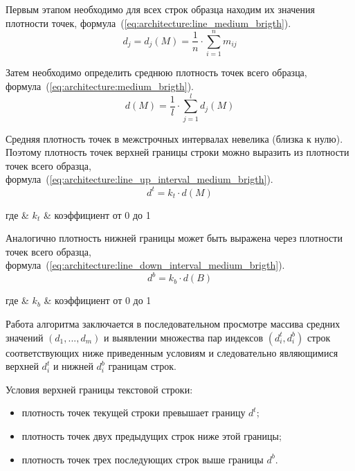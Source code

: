 Первым этапом необходимо для всех строк образца находим их значения плотности точек, формула~(\ref{eq:architecture:line_medium_brigth}).
\begin{equation}
  \label{eq:architecture:line_medium_brigth}
  d_j = d_j(M) = \frac{1}{n}\cdot\sum\limits_{i=1}^{n} m_{ij}
\end{equation}

Затем необходимо определить среднюю плотность точек всего образца, \mbox{формула~(\ref{eq:architecture:medium_brigth}).}
\begin{equation}
  \label{eq:architecture:medium_brigth}
  d(M) = \frac{1}{l}\cdot\sum\limits_{j=1}^{l} d_j(M)
\end{equation}

Средняя плотность точек в межстрочных интервалах невелика (близка к нулю). Поэтому плотность точек верхней границы строки можно выразить из плотности точек всего образца, формула~(\ref{eq:architecture:line_up_interval_medium_brigth}).
\begin{equation}
  \label{eq:architecture:line_up_interval_medium_brigth}
  d^{t} = k_{t} \cdot d(M)
\end{equation}
\begin{explanation}
где & $ k_{t} $ & коэффициент от 0 до 1
\end{explanation}

Аналогично плотность нижней границы может быть выражена через плотности точек всего образца, формула~(\ref{eq:architecture:line_down_interval_medium_brigth}).
\begin{equation}
  \label{eq:architecture:line_down_interval_medium_brigth}
  d^{b} = k_{b} \cdot d(B)
\end{equation}
\begin{explanation}
где & $ k_{b} $ & коэффициент от 0 до 1
\end{explanation}

Работа алгоритма заключается в последовательном просмотре массива средних значений $ (d_1,...,d_m) $ и выявлении множества пар индексов $ (d^t_i,d^b_i) $ строк соответствующих ниже приведенным условиям и следовательно являющимися верхней $ d^t_i $ и нижней $ d^b_i $ границам строк.

Условия верхней границы текстовой строки:
\begin{itemize}
  \item плотность точек текущей строки превышает границу $ d^{t} $;
  \item плотность точек двух предыдущих строк ниже этой границы;
  \item плотность точек трех последующих строк выше границы $ d^{b} $.
\end{itemize}

